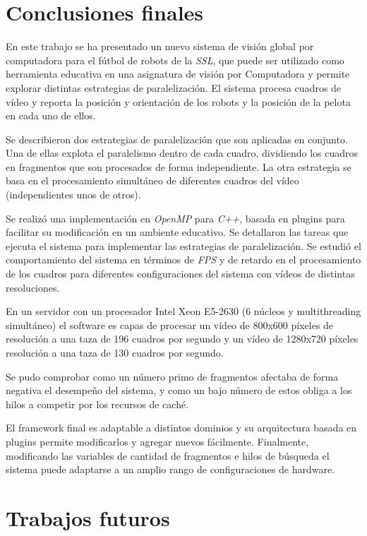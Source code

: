 
\section{Conclusiones finales}

\label{concluciones}

En este trabajo se ha presentado un nuevo sistema de visión global por
computadora para el fútbol de robots de la \emph{SSL}, que puede ser utilizado
como herramienta educativa en una asignatura de visión por Computadora y permite
explorar distintas estrategias de paralelización. El sistema procesa cuadros de
vídeo y reporta la posición y orientación de los robots y la posición de la
pelota en cada uno de ellos.

Se describieron dos estrategias de paralelización que son aplicadas en conjunto.
Una de ellas explota el paralelismo dentro de cada cuadro, dividiendo los
cuadros en fragmentos que son procesados de forma independiente. La otra
estrategia se basa en el procesamiento simultáneo de diferentes cuadros del
vídeo (independientes unos de otros).

Se realizó una implementación en \emph{OpenMP} para \emph{C++}, basada en
plugins para facilitar su modificación en un ambiente educativo. Se detallaron
las tareas que ejecuta el sistema para implementar las estrategias de
paralelización. Se estudió el comportamiento del sistema en términos de
\emph{FPS} y de retardo en el procesamiento de los cuadros para diferentes
configuraciones del sistema con vídeos de distintas resoluciones.

En un servidor con un procesador Intel Xeon E5-2630 (6 núcleos y multithreading
simultáneo) el software es capas de procesar un vídeo de 800x600 píxeles de
resolución a una taza de 196 cuadros por segundo y un vídeo de 1280x720 píxeles
resolución a una taza de 130 cuadros por segundo.

Se pudo comprobar como un número primo de fragmentos afectaba de forma negativa
el desempeño del sistema, y como un bajo número de estos obliga a los hilos a
competir por los recursos de caché.

El framework final es adaptable a distintos dominios y su arquitectura basada en
plugins permite modificarlos y agregar nuevos fácilmente. Finalmente,
modificando las variables de cantidad de fragmentos e hilos de búsqueda el
sistema puede adaptarse a un amplio rango de configuraciones de hardware.

\section{Trabajos futuros}

